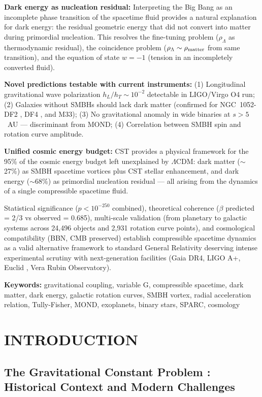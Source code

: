 \documentclass[10pt,a4paper]{article}
\begin{document}
\textbf{Dark energy as nucleation residual:} Interpreting the Big Bang as an incomplete phase transition of the spacetime fluid provides a natural explanation for dark energy: the residual geometric energy that did not convert into matter during primordial nucleation. This resolves the fine-tuning problem ($\rho_\Lambda$ as thermodynamic residual), the coincidence problem ($\rho_\Lambda \sim \rho_{\rm matter}$ from same transition), and the equation of state $w = -1$ (tension in an incompletely converted fluid).

\textbf{Novel predictions testable with current instruments:} (1)
Longitudinal gravitational wave polarization \(h_L/h_T \sim 10^{-2}\)
detectable in LIGO/Virgo O4 run; (2) Galaxies without SMBHs should lack dark matter (confirmed for NGC~1052-DF2 \cite{vanDokkum2018}, DF4 \cite{vanDokkum2019}, and M33); (3) No gravitational anomaly in wide binaries at $s > 5$~AU --- discriminant from MOND; (4) Correlation between SMBH spin and rotation curve amplitude.

\textbf{Unified cosmic energy budget:} CST provides a physical framework for the 95\% of the cosmic energy budget left unexplained by $\Lambda$CDM: dark matter ($\sim$27\%) as SMBH spacetime vortices plus CST stellar enhancement, and dark energy ($\sim$68\%) as primordial nucleation residual --- all arising from the dynamics of a single compressible spacetime fluid.

Statistical significance (\(p < 10^{-250}\) combined), theoretical
coherence (\(\beta\) predicted = 2/3 vs observed = 0.685), multi-scale
validation (from planetary to galactic systems across 24,496 objects and
2,931 rotation curve points), and cosmological
compatibility (BBN, CMB preserved) establish compressible spacetime
dynamics as a valid alternative framework to standard General Relativity
deserving intense experimental scrutiny with next-generation facilities
(Gaia DR4, LIGO A+, Euclid \cite{ref17}, Vera Rubin Observatory).

\textbf{Keywords:} gravitational coupling, variable G, compressible
spacetime, dark matter, dark energy, galactic rotation curves, SMBH vortex,
radial acceleration relation, Tully-Fisher, MOND, exoplanets, binary stars,
SPARC, cosmology

\section{INTRODUCTION}\label{introduction}

\subsection{The Gravitational Constant Problem \cite{Uzan2011}: Historical
Context and Modern
Challenges}\label{the-gravitational-constant-problem-historical-context-and-modern-challenges}
\end{document}
